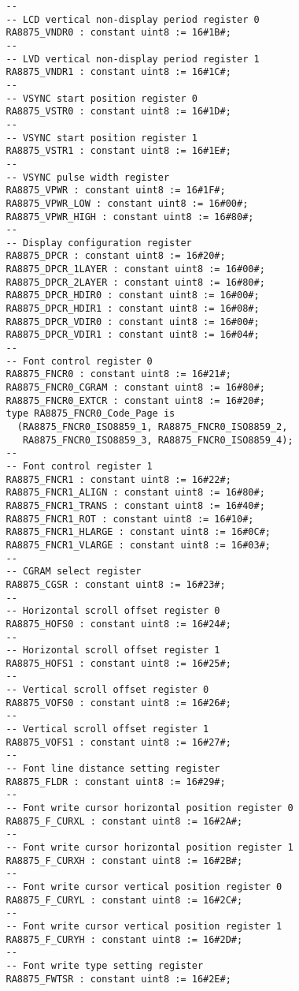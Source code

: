 \documentclass[10pt, openany]{book}
\begin{document}
\begin{lstlisting}
   --
   -- LCD vertical non-display period register 0
   RA8875_VNDR0 : constant uint8 := 16#1B#;
   --
   -- LVD vertical non-display period register 1
   RA8875_VNDR1 : constant uint8 := 16#1C#;
   --
   -- VSYNC start position register 0
   RA8875_VSTR0 : constant uint8 := 16#1D#;
   --
   -- VSYNC start position register 1
   RA8875_VSTR1 : constant uint8 := 16#1E#;
   --
   -- VSYNC pulse width register
   RA8875_VPWR : constant uint8 := 16#1F#;
   RA8875_VPWR_LOW : constant uint8 := 16#00#;
   RA8875_VPWR_HIGH : constant uint8 := 16#80#;
   --
   -- Display configuration register
   RA8875_DPCR : constant uint8 := 16#20#;
   RA8875_DPCR_1LAYER : constant uint8 := 16#00#;
   RA8875_DPCR_2LAYER : constant uint8 := 16#80#;
   RA8875_DPCR_HDIR0 : constant uint8 := 16#00#;
   RA8875_DPCR_HDIR1 : constant uint8 := 16#08#;
   RA8875_DPCR_VDIR0 : constant uint8 := 16#00#;
   RA8875_DPCR_VDIR1 : constant uint8 := 16#04#;
   --
   -- Font control register 0
   RA8875_FNCR0 : constant uint8 := 16#21#;
   RA8875_FNCR0_CGRAM : constant uint8 := 16#80#;
   RA8875_FNCR0_EXTCR : constant uint8 := 16#20#;
   type RA8875_FNCR0_Code_Page is
     (RA8875_FNCR0_ISO8859_1, RA8875_FNCR0_ISO8859_2,
      RA8875_FNCR0_ISO8859_3, RA8875_FNCR0_ISO8859_4);
   --
   -- Font control register 1
   RA8875_FNCR1 : constant uint8 := 16#22#;
   RA8875_FNCR1_ALIGN : constant uint8 := 16#80#;
   RA8875_FNCR1_TRANS : constant uint8 := 16#40#;
   RA8875_FNCR1_ROT : constant uint8 := 16#10#;
   RA8875_FNCR1_HLARGE : constant uint8 := 16#0C#;
   RA8875_FNCR1_VLARGE : constant uint8 := 16#03#;
   --
   -- CGRAM select register
   RA8875_CGSR : constant uint8 := 16#23#;
   --
   -- Horizontal scroll offset register 0
   RA8875_HOFS0 : constant uint8 := 16#24#;
   --
   -- Horizontal scroll offset register 1
   RA8875_HOFS1 : constant uint8 := 16#25#;
   --
   -- Vertical scroll offset register 0
   RA8875_VOFS0 : constant uint8 := 16#26#;
   --
   -- Vertical scroll offset register 1
   RA8875_VOFS1 : constant uint8 := 16#27#;
   --
   -- Font line distance setting register
   RA8875_FLDR : constant uint8 := 16#29#;
   --
   -- Font write cursor horizontal position register 0
   RA8875_F_CURXL : constant uint8 := 16#2A#;
   --
   -- Font write cursor horizontal position register 1
   RA8875_F_CURXH : constant uint8 := 16#2B#;
   --
   -- Font write cursor vertical position register 0
   RA8875_F_CURYL : constant uint8 := 16#2C#;
   --
   -- Font write cursor vertical position register 1
   RA8875_F_CURYH : constant uint8 := 16#2D#;
   --
   -- Font write type setting register
   RA8875_FWTSR : constant uint8 := 16#2E#;

\end{lstlisting}
\end{document}
